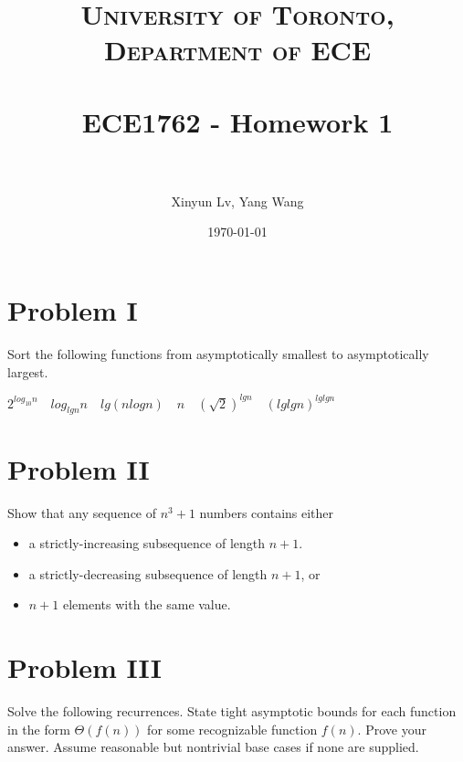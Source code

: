 \documentclass[paper=a4, fontsize=11pt]{scrartcl} %
\title{	
\normalfont \normalsize 
\textsc{University of Toronto, Department of ECE} \\ [25pt] %
\horrule{0.5pt} \\[0.4cm] %
\huge ECE1762 - Homework 1 \\ %
\horrule{2pt} \\[0.5cm] %
}
\author{Xinyun Lv, Yang Wang} %
\date{\normalsize\today} %
\numberwithin{equation}{section} %
\numberwithin{figure}{section} %
\numberwithin{table}{section} %
\begin{document}
\maketitle %


\section{Problem I}
Sort the following functions from asymptotically smallest to asymptotically largest.

\begin{center}
	$ 2^{log_{10}{n}} \quad log_{lg{n}}{n} \quad  lg(nlog{n})  \quad  n \quad (\sqrt{2})^{lg{n}} \quad (lglgn)^{lglgn} $
\end{center}

\section{Problem II}
Show that any sequence of $n^3 + 1$ numbers contains either
\begin{itemize}
	\item a strictly-increasing subsequence of length $n + 1$.
	\item a strictly-decreasing subsequence of length $n + 1$, or
	\item $n + 1$ elements with the same value.
\end{itemize}

\section{Problem III}
 Solve the following recurrences. State tight asymptotic bounds for each function in the form $\Theta(f(n))$ for some recognizable function $f(n)$. Prove your answer. Assume reasonable but nontrivial base cases if none are supplied.
\end{document}
